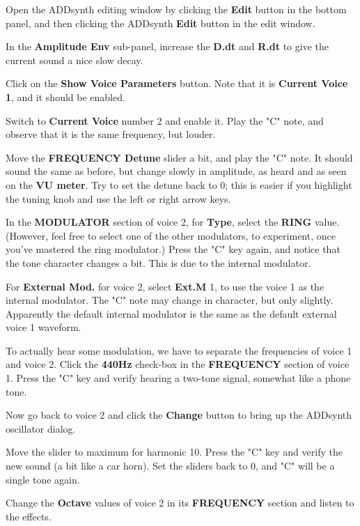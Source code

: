    \begin{enumber}
      \item Open the ADDsynth editing window by clicking the \textbf{Edit} button
         in the bottom panel, and then clicking the ADDsynth \textbf{Edit}
         button in the edit window.
      \item In the \textbf{Amplitude Env} sub-panel, increase the
         \textbf{D.dt} and \textbf{R.dt} to give the current
         sound a nice slow decay.
      \item Click on the \textbf{Show Voice Parameters} button.
         Note that it is \textbf{Current Voice 1}, and it should be enabled.
      \item Switch to \textbf{Current Voice} number 2 and enable it.
         Play the "C" note, and observe that it is the same frequency, but
         louder.
      \item Move the \textbf{FREQUENCY Detune} slider a bit, and play the "C"
         note.  It should sound the same as before, but change slowly in
         amplitude, as heard and as seen on the \textbf{VU meter}.
         Try to set the detune back to 0; this is easier if you highlight
         the tuning knob and use the left or right arrow keys.
      \item In the \textbf{MODULATOR} section of voice 2, for \textbf{Type},
         select the \textbf{RING} value.  (However, feel free to select one
         of the other modulators, to experiment, once you've mastered
         the ring modulator.)  Press the "C" key again, and notice
         that the tone character changes a bit.  This is due to the internal
         modulator.
      \item For \textbf{External Mod.} for voice 2, select
         \textbf{Ext.M} 1, to use the voice 1 as the internal modulator.
         The "C" note may change in character, but only slightly.
         Apparently the default internal modulator is the same as the
         default external voice 1 waveform.
      \item To actually hear some modulation, we have to separate the
         frequencies of voice 1 and voice 2.  Click the \textbf{440Hz}
         check-box in the \textbf{FREQUENCY} section of voice 1.  Press the
         "C" key and verify hearing a two-tone signal, somewhat like a phone
         tone.
      \item Now go back to voice 2 and click the \textbf{Change} button to
         bring up the ADDsynth oscillator dialog.
      \item Move the slider to maximum for harmonic 10.  Press the "C" key
         and verify the new sound (a bit like a car horn).
         Set the sliders back to 0, and "C" will be a single tone again.
      \item Change the \textbf{Octave} values of voice 2 in its
         \textbf{FREQUENCY} section and listen to the effects.
   \end{enumber}

